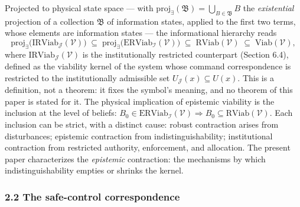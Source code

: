 \documentclass[11pt]{article}
\begin{document}
Projected to physical state space --- with
\(\mathrm{proj}_{\exists}(\mathfrak{B}) = \bigcup_{B \in \mathfrak{B}} B\)
the \emph{existential} projection of a collection \(\mathfrak{B}\) of
information states, applied to the first two terms, whose elements are information states --- the informational hierarchy
reads
\[\mathrm{proj}_{\exists}\big(\mathrm{IRViab}_{\mathcal{J}}(\mathcal{V})\big) \;\subseteq\; \mathrm{proj}_{\exists}\big(\mathrm{ERViab}_{\mathcal{I}}(\mathcal{V})\big) \;\subseteq\; \mathrm{RViab}(\mathcal{V}) \;\subseteq\; \mathrm{Viab}(\mathcal{V}),\]
where \(\mathrm{IRViab}_{\mathcal{J}}(\mathcal{V})\) is the institutionally restricted counterpart (Section 6.4), defined as the viability kernel of the system whose command correspondence is restricted to the institutionally admissible set \(U_{\mathcal{J}}(x) \subseteq U(x)\). This is a definition, not a theorem: it fixes the symbol's meaning, and no theorem of this paper is stated for it. The physical implication of epistemic viability is the
inclusion at the level of beliefs:
\(B_0 \in \mathrm{ERViab}_{\mathcal{I}}(\mathcal{V}) \Rightarrow B_0 \subseteq \mathrm{RViab}(\mathcal{V})\).
Each inclusion can be strict, with a distinct cause: robust contraction
arises from disturbances; epistemic contraction from
indistinguishability; institutional contraction from restricted
authority, enforcement, and allocation. The present paper characterizes
the \emph{epistemic} contraction: the mechanisms by which
indistinguishability empties or shrinks the kernel.

\subsubsection{2.2 The safe-control
correspondence}\label{the-safe-control-correspondence}
\end{document}
